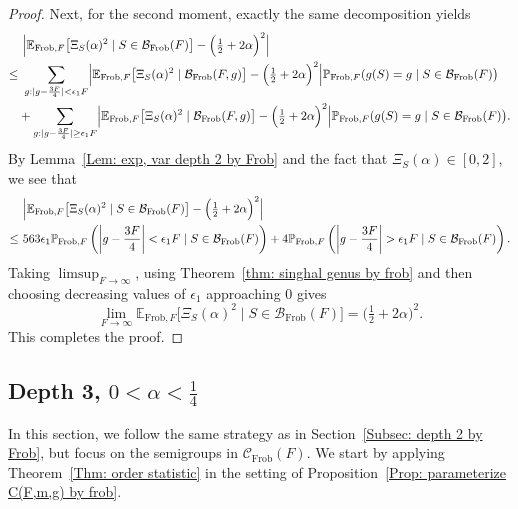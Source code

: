 \documentclass[12pt]{amsart}
\def\B{{\mathcal B}}
\def\E{{\mathbb E}}
\renewcommand{\P}{\mathbb{P}}
\newcommand{\cC}{\mathcal{C}}
\newcommand{\Frob}{\text{Frob}}
\begin{document}
\begin{proof}
Next, for the second moment, exactly the same decomposition yields
\begin{align*}
&\ \Bigl|\E_{\Frob,F}\big[\Xi_S(\alpha)^2 \mid S\in\mathcal B_{\Frob}(F) \big]-\Big(\tfrac12+2\alpha\Big)^2\Bigr|\\
\le & \ \sum_{g: |g-\frac{3F}{4}|<\epsilon_1 F}
\Bigl|\E_{\Frob,F}\big[\Xi_S(\alpha)^2\mid \B_{\Frob}(F,g)\big]-\Big(\tfrac12+2\alpha\Big)^2\Bigr|
   \P_{\Frob,F}(g(S)=g \mid S\in\mathcal B_{\Frob}(F)\big)\\
& +\sum_{g: |g-\frac{3F}{4}| \ge \epsilon_1 F}
\Bigl|\E_{\Frob,F}\big[\Xi_S(\alpha)^2\mid \B_{\Frob}(F,g)\big]-\Big(\tfrac12+2\alpha\Big)^2\Bigr|
   \P_{\Frob,F}(g(S)=g\mid S\in\mathcal B_{\Frob}(F)\big).
\end{align*}
By Lemma~\ref{Lem: exp, var depth 2 by Frob} and the fact that $\Xi_S(\alpha)\in[0,2]$, we see that
\begin{align*}
&\ \Bigl|\E_{\Frob,F}\big[\Xi_S(\alpha)^2 \mid S\in\mathcal B_{\Frob}(F) \big]-\Big(\tfrac12+2\alpha\Big)^2\Bigr|\\
\le &\ 563\epsilon_1 \P_{\Frob,F}\left(\left|g-\frac{3F}{4}\right|<\epsilon_1 F \mid S\in\mathcal B_{\Frob}(F)\right)
+4\P_{\Frob,F}\left(\left|g-\frac{3F}{4}\right|>\epsilon_1 F \mid S\in\mathcal B_{\Frob}(F)\right).
\end{align*}
Taking $\limsup_{F\to\infty}$, using Theorem~\ref{thm: singhal genus by frob} and then choosing decreasing values of $\epsilon_1$ approaching $0$ gives
\[
\lim_{F\to\infty}\E_{\Frob,F}\big[\Xi_S(\alpha)^2 \mid S\in\mathcal B_{\Frob}(F) \big]=\Big(\tfrac12+2\alpha\Big)^2.
\]
This completes the proof.
\end{proof}


\subsection{Depth 3, $0<\alpha<\frac{1}{4}$}

In this section, we follow the same strategy as in Section~\ref{Subsec: depth 2 by Frob}, but focus on the semigroups in $\cC_{\Frob}(F)$. We start by applying Theorem~\ref{Thm: order statistic} in the setting of Proposition~\ref{Prop: parameterize C(F,m,g) by frob}.  
\end{document}
